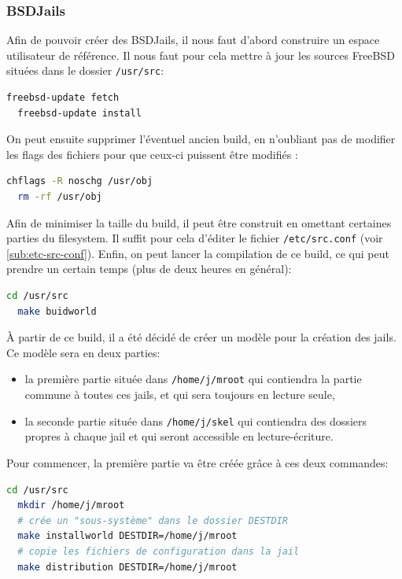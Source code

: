 \documentclass[10pt,a4paper]{article}
\begin{document}
\subsubsection{BSDJails}
\label{subs:Contrôle des BSDJails}
Afin de pouvoir créer des BSDJails, il nous faut d'abord construire un espace utilisateur de référence.
Il nous faut pour cela mettre à jour les sources FreeBSD situées dans le dossier \texttt{/usr/src}:
\begin{lstlisting}[language=bash]
  freebsd-update fetch
  freebsd-update install
\end{lstlisting}

On peut ensuite supprimer l'éventuel ancien build, en n'oubliant pas de modifier les flags des fichiers pour que ceux-ci puissent être modifiés :
\begin{lstlisting}[language=bash]
  chflags -R noschg /usr/obj
  rm -rf /usr/obj
\end{lstlisting}

Afin de minimiser la taille du build, il peut être construit en omettant certaines parties du filesystem. Il suffit pour cela d'éditer le fichier \texttt{/etc/src.conf} (voir \ref{sub:etc-src-conf}).
Enfin, on peut lancer la compilation de ce build, ce qui peut prendre un certain temps (plus de deux heures en général):
\begin{lstlisting}[language=bash]
  cd /usr/src
  make buidworld
\end{lstlisting}

À partir de ce build, il a été décidé de créer un modèle pour la création des jails.
Ce modèle sera en deux parties:
\begin{itemize}
  \item la première partie située dans \texttt{/home/j/mroot} qui contiendra la partie commune à toutes ces jails, et qui sera toujours en lecture seule,
  \item la seconde partie située dans \texttt{/home/j/skel} qui contiendra des dossiers propres à chaque jail et qui seront accessible en lecture-écriture.
\end{itemize}

Pour commencer, la première partie va être créée grâce à ces deux commandes:
\begin{lstlisting}[language=bash]
  cd /usr/src
  mkdir /home/j/mroot
  # crée un "sous-système" dans le dossier DESTDIR
  make installworld DESTDIR=/home/j/mroot
  # copie les fichiers de configuration dans la jail
  make distribution DESTDIR=/home/j/mroot
\end{lstlisting}
\end{document}

